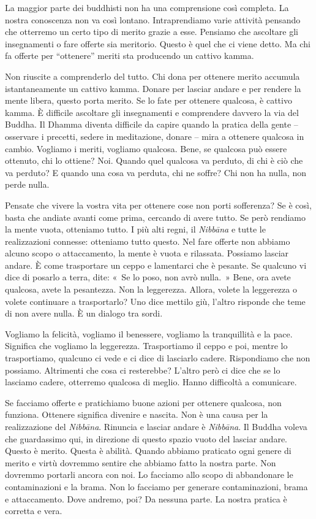 La maggior parte dei buddhisti non ha una comprensione così completa. La
nostra conoscenza non va così lontano. Intraprendiamo varie attività
pensando che otterremo un certo tipo di merito grazie a esse. Pensiamo
che ascoltare gli insegnamenti o fare offerte sia meritorio. Questo è
quel che ci viene detto. Ma chi fa offerte per ``ottenere'' meriti sta
producendo un cattivo kamma.

Non riuscite a comprenderlo del tutto. Chi dona per ottenere merito
accumula istantaneamente un cattivo kamma. Donare per lasciar
andare e per rendere la mente libera, questo porta merito. Se lo fate
per ottenere qualcosa, è cattivo kamma. È difficile ascoltare gli
insegnamenti e comprendere davvero la via del Buddha. Il Dhamma diventa
difficile da capire quando la pratica della gente -- osservare i
precetti, sedere in meditazione, donare -- mira a ottenere qualcosa in
cambio. Vogliamo i meriti, vogliamo qualcosa. Bene, se qualcosa può
essere ottenuto, chi lo ottiene? Noi. Quando quel qualcosa va perduto,
di chi è ciò che va perduto? E quando una cosa va perduta, chi ne
soffre? Chi non ha nulla, non perde nulla.

Pensate che vivere la vostra vita per ottenere cose non porti
sofferenza? Se è così, basta che andiate avanti come prima, cercando di
avere tutto. Se però rendiamo la mente vuota, otteniamo tutto. I più
alti regni, il \emph{Nibbāna} e tutte le realizzazioni connesse:
otteniamo tutto questo. Nel fare offerte non abbiamo alcuno scopo o
attaccamento, la mente è vuota e rilassata. Possiamo lasciar andare. È
come trasportare un ceppo e lamentarci che è pesante. Se qualcuno vi
dice di posarlo a terra, dite: «~Se lo poso, non avrò nulla.~» Bene, ora
avete qualcosa, avete la pesantezza. Non la leggerezza. Allora, volete
la leggerezza o volete continuare a trasportarlo? Uno dice mettilo giù,
l'altro risponde che teme di non avere nulla. È un dialogo tra sordi.

Vogliamo la felicità, vogliamo il benessere, vogliamo la tranquillità e
la pace. Significa che vogliamo la leggerezza. Trasportiamo il ceppo e
poi, mentre lo trasportiamo, qualcuno ci vede e ci dice di lasciarlo
cadere. Rispondiamo che non possiamo. Altrimenti che cosa ci resterebbe?
L'altro però ci dice che se lo lasciamo cadere, otterremo qualcosa di
meglio. Hanno difficoltà a comunicare.

Se facciamo offerte e pratichiamo buone azioni per ottenere qualcosa,
non funziona. Ottenere significa divenire e nascita. Non è una causa per
la realizzazione del \emph{Nibbāna}. Rinuncia e lasciar andare è
\emph{Nibbāna}. Il Buddha voleva che guardassimo qui, in direzione di
questo spazio vuoto del lasciar andare. Questo è merito. Questa è
abilità. Quando abbiamo praticato ogni genere di merito e virtù dovremmo
sentire che abbiamo fatto la nostra parte. Non dovremmo portarli ancora
con noi. Lo facciamo allo scopo di abbandonare le contaminazioni e la
brama. Non lo facciamo per generare contaminazioni, brama e
attaccamento. Dove andremo, poi? Da nessuna parte. La nostra pratica è
corretta e vera.

